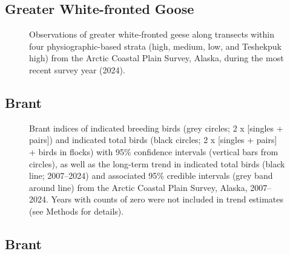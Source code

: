 \documentclass[
]{article}
\begin{document}
\endgroup{}

\newpage{}

\subsection*{Greater White-fronted
Goose}\label{greater-white-fronted-goose-2}

\begin{figure}


\caption{\label{fig-GWFGmap}Observations of greater white-fronted geese
along transects within four physiographic-based strata (high, medium,
low, and Teshekpuk high) from the Arctic Coastal Plain Survey, Alaska,
during the most recent survey year (2024).}

\end{figure}%

\newpage{}

\subsection*{Brant}\label{brant}

\begin{figure}


\caption{\label{fig-BRAN}Brant indices of indicated breeding birds (grey
circles; 2 x {[}singles + pairs{]}) and indicated total birds (black
circles; 2 x {[}singles + pairs{]} + birds in flocks) with 95\%
confidence intervals (vertical bars from circles), as well as the
long-term trend in indicated total birds (black line; 2007--2024) and
associated 95\% credible intervals (grey band around line) from the
Arctic Coastal Plain Survey, Alaska, 2007--2024. Years with counts of
zero were not included in trend estimates (see Methods for details).}

\end{figure}%

\newpage{}

\subsection*{Brant}\label{brant-1}
\end{document}
